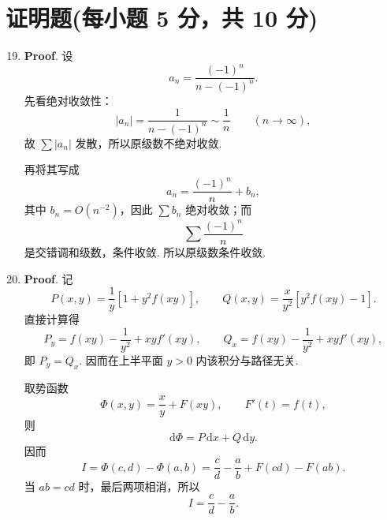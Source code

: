 \documentclass[../Main.tex]{subfiles}
\begin{document}
\section{证明题(每小题 5 分，共 10 分)}
\begin{enumerate}
    \setcounter{enumi}{18}
    \item \textbf{Proof}. 设
          \[
              a_n=\frac{(-1)^n}{n-(-1)^n}.
          \]
          先看绝对收敛性：
          \[
              |a_n|=\frac{1}{n-(-1)^n}\sim \frac{1}{n}\qquad (n\to\infty),
          \]
          故 \(\sum |a_n|\) 发散，所以原级数不绝对收敛.

          再将其写成
          \[
              a_n=\frac{(-1)^n}{n}+b_n,
          \]
          其中 \(b_n=O(n^{-2})\)，因此 \(\sum b_n\) 绝对收敛；而
          \[
              \sum \frac{(-1)^n}{n}
          \]
          是交错调和级数，条件收敛. 所以原级数条件收敛.

    \item \textbf{Proof}. 记
          \[
              P(x,y)=\frac{1}{y}[1+y^2f(xy)],\qquad
              Q(x,y)=\frac{x}{y^2}[y^2f(xy)-1].
          \]
          直接计算得
          \[
              P_y=f(xy)-\frac{1}{y^2}+xyf'(xy),\qquad
              Q_x=f(xy)-\frac{1}{y^2}+xyf'(xy),
          \]
          即 \(P_y=Q_x\). 因而在上半平面 \(y>0\) 内该积分与路径无关.

          取势函数
          \[
              \Phi(x,y)=\frac{x}{y}+F(xy),\qquad F'(t)=f(t),
          \]
          则
          \[
              \mathrm{d}\Phi=P\,\mathrm{d}x+Q\,\mathrm{d}y.
          \]
          因而
          \[
              I=\Phi(c,d)-\Phi(a,b)=\frac{c}{d}-\frac{a}{b}+F(cd)-F(ab).
          \]
          当 \(ab=cd\) 时，最后两项相消，所以
          \[
              I=\frac{c}{d}-\frac{a}{b}.
          \]
\end{enumerate}
\end{document}
